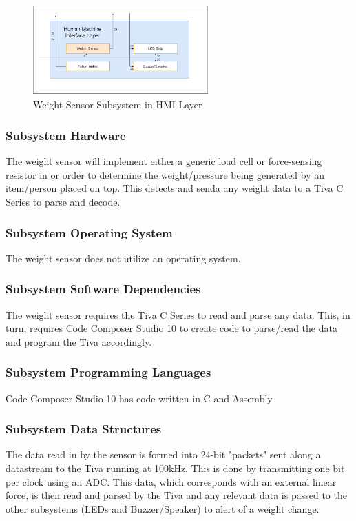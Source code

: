 \begin{figure}[h!]
	\centering
 	\includegraphics[width=0.60\textwidth]{images/Kendall/Weight Sensor.png}
 \caption{Weight Sensor Subsystem in HMI Layer}
\end{figure}

\subsubsection{Subsystem Hardware}
The weight sensor will implement either a generic load cell or force-sensing resistor in or order to determine the weight/pressure being generated by an item/person placed on top. This detects and senda any weight data to a Tiva C Series to parse and decode.

\subsubsection{Subsystem Operating System}
The weight sensor does not utilize an operating system.

\subsubsection{Subsystem Software Dependencies}
The weight sensor requires the Tiva C Series to read and parse any data. This, in turn, requires Code Composer Studio 10 to create code to parse/read the data and program the Tiva accordingly.

\subsubsection{Subsystem Programming Languages}
Code Composer Studio 10 has code written in C and Assembly.

\subsubsection{Subsystem Data Structures}
The data read in by the sensor is formed into 24-bit "packets" sent along a datastream to the Tiva running at 100kHz. This is done by transmitting one bit per clock using an ADC. This data, which corresponds with an external linear force, is then read and parsed by the Tiva and any relevant data is passed to the other subsystems (LEDs and Buzzer/Speaker) to alert of a weight change.


